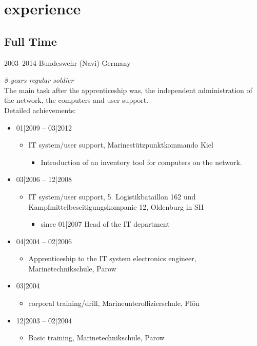 \documentclass[]{friggeri-cv} %
\begin{document}
\section{experience}

\subsection{Full Time}

\begin{entrylist}


\entry
{2003--2014}
{Bundeswehr {\normalfont(Navi)}}
{Germany}
{\emph{8 years regular soldier} \\
The main task after the apprenticeship was, the independent administration of the network, the computers and user support. \\

Detailed achievements:
\begin{itemize}
\item[]01|2009 – 03|2012
\begin{itemize}
\item IT system/user support, Marinestützpunktkommando Kiel	
	\begin{itemize}
	\item Introduction of an inventory tool for computers on the network.
	\end{itemize}
\end{itemize}
\item[]03|2006 – 12|2008
\begin{itemize}
\item IT system/user support, 5. Logistikbataillon 162 und Kampfmittelbeseitigungskompanie 12, Oldenburg in SH	
	\begin{itemize}
	\item since 01|2007 Head of the IT department
	\end{itemize}
\end{itemize}
\item[]04|2004 – 02|2006
\begin{itemize}
\item Apprenticeship to the IT system electronics engineer, Marinetechnikschule, Parow
\end{itemize}
\item[]03|2004
\begin{itemize}
\item corporal training/drill, Marineunteroffizierschule, Plön
\end{itemize}
\item[]12|2003 – 02|2004
\begin{itemize}
\item Basic training, Marinetechnikschule, Parow
\end{itemize}
\end{itemize}}



\end{entrylist}
\newpage
\end{document}
